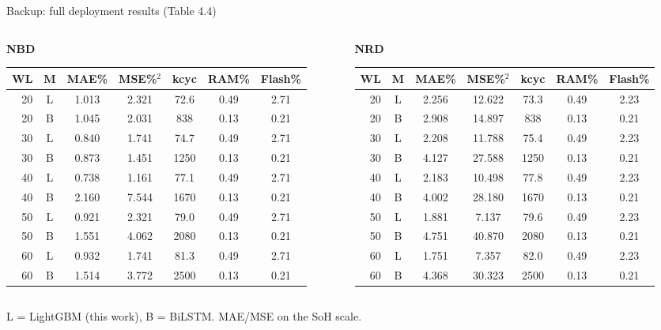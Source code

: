 \documentclass[11pt,aspectratio=169]{beamer}
\begin{document}
\begin{frame}{Backup: full deployment results (Table 4.4)}
  {\scriptsize
  \begin{columns}[T]
    \begin{column}{0.5\textwidth}
      \centering\textbf{NBD}\\[0.2em]
      \begin{tabular}{@{}rcccccc@{}}
        \toprule
        WL & M & MAE\% & MSE\%$^2$ & kcyc & RAM\% & Flash\%\\
        \midrule
        20 & L & 1.013 & 2.321 & 72.6 & 0.49 & 2.71\\
        20 & B & 1.045 & 2.031 & 838 & 0.13 & 0.21\\
        30 & L & 0.840 & 1.741 & 74.7 & 0.49 & 2.71\\
        30 & B & 0.873 & 1.451 & 1250 & 0.13 & 0.21\\
        40 & L & 0.738 & 1.161 & 77.1 & 0.49 & 2.71\\
        40 & B & 2.160 & 7.544 & 1670 & 0.13 & 0.21\\
        50 & L & 0.921 & 2.321 & 79.0 & 0.49 & 2.71\\
        50 & B & 1.551 & 4.062 & 2080 & 0.13 & 0.21\\
        60 & L & 0.932 & 1.741 & 81.3 & 0.49 & 2.71\\
        60 & B & 1.514 & 3.772 & 2500 & 0.13 & 0.21\\
        \bottomrule
      \end{tabular}
    \end{column}
    \begin{column}{0.5\textwidth}
      \centering\textbf{NRD}\\[0.2em]
      \begin{tabular}{@{}rcccccc@{}}
        \toprule
        WL & M & MAE\% & MSE\%$^2$ & kcyc & RAM\% & Flash\%\\
        \midrule
        20 & L & 2.256 & 12.622 & 73.3 & 0.49 & 2.23\\
        20 & B & 2.908 & 14.897 & 838 & 0.13 & 0.21\\
        30 & L & 2.208 & 11.788 & 75.4 & 0.49 & 2.23\\
        30 & B & 4.127 & 27.588 & 1250 & 0.13 & 0.21\\
        40 & L & 2.183 & 10.498 & 77.8 & 0.49 & 2.23\\
        40 & B & 4.002 & 28.180 & 1670 & 0.13 & 0.21\\
        50 & L & 1.881 & 7.137 & 79.6 & 0.49 & 2.23\\
        50 & B & 4.751 & 40.870 & 2080 & 0.13 & 0.21\\
        60 & L & 1.751 & 7.357 & 82.0 & 0.49 & 2.23\\
        60 & B & 4.368 & 30.323 & 2500 & 0.13 & 0.21\\
        \bottomrule
      \end{tabular}
    \end{column}
  \end{columns}}
  {\scriptsize L = LightGBM (this work), B = BiLSTM. MAE/MSE on the SoH scale.}
\end{frame}
\end{document}
